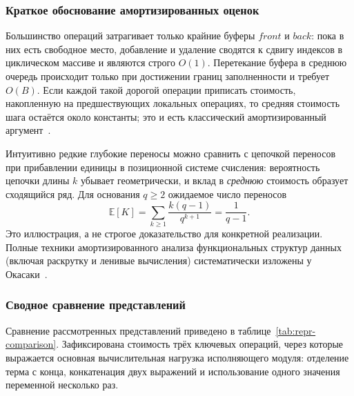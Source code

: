 \subsubsection{Краткое обоснование амортизированных оценок}

Большинство операций затрагивает только крайние буферы \(front\) и
\(back\): пока в них есть свободное место, добавление и удаление
сводятся к сдвигу индексов в циклическом массиве и являются строго
\(O(1)\). Перетекание буфера в среднюю очередь происходит только при
достижении границ заполненности и требует \(O(B)\). Если каждой такой
дорогой операции приписать стоимость, накопленную на предшествующих
локальных операциях, то средняя стоимость шага остаётся около константы;
это и есть классический амортизированный аргумент~\cite{okasaki_pfds}.

Интуитивно редкие глубокие переносы можно сравнить с цепочкой переносов
при прибавлении единицы в позиционной системе счисления: вероятность
цепочки длины \(k\) убывает геометрически, и вклад в \emph{среднюю}
стоимость образует сходящийся ряд. Для основания \(q \ge 2\) ожидаемое
число переносов
\[
  \mathbb{E}[K] = \sum_{k\ge 1} \frac{k(q-1)}{q^{k+1}} = \frac{1}{q-1}.
\]
Это иллюстрация, а не строгое доказательство для конкретной реализации.
Полные техники амортизированного анализа функциональных структур данных
(включая раскрутку и ленивые вычисления) систематически изложены у
Окасаки~\cite{okasaki_pfds}.

\subsubsection{Сводное сравнение представлений}

Сравнение рассмотренных представлений приведено в
таблице~\ref{tab:repr-comparison}. Зафиксирована стоимость трёх ключевых
операций, через которые выражается основная вычислительная нагрузка
исполняющего модуля: отделение терма с конца, конкатенация двух выражений
и использование одного значения переменной несколько раз.

